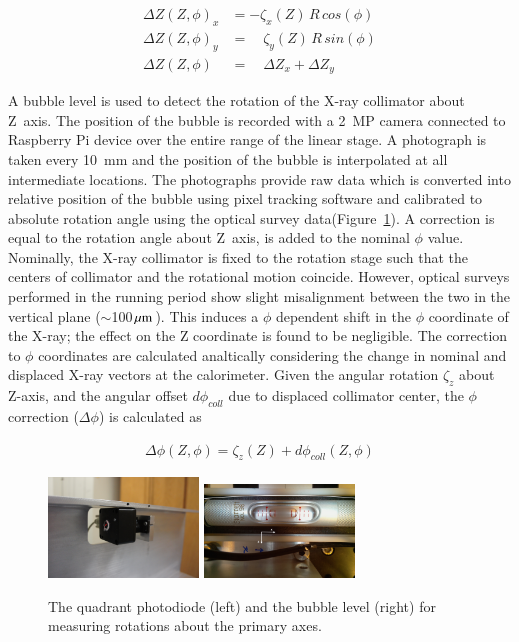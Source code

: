     \begin{align}
      \Delta Z(Z,\phi)_x &= -\zeta_x(Z)\,R\,cos(\phi)     \\
      \Delta Z(Z,\phi)_y &= \quad \zeta_y(Z)\,R\,sin(\phi) \\
      \Delta Z(Z,\phi)\  &= \quad \Delta Z_x + \Delta Z_y
    \end{align}

  A bubble level is used to detect the rotation of the X-ray
  collimator about Z~axis.  The position of the bubble is recorded
  with a 2~MP camera connected to Raspberry Pi device over the entire
  range of the linear stage.  A photograph is taken every 10~mm and
  the position of the bubble is interpolated at all intermediate
  locations. The photographs provide raw data which is converted into
  relative position of the bubble using pixel tracking
  software\cite{imagej} and calibrated to absolute rotation angle
  using the optical survey data(Figure~\ref{fig:bubblelevel}).  A
  correction is equal to the rotation angle about Z~axis, is added to
  the nominal $\phi$ value. Nominally, the X-ray collimator is fixed
  to the rotation stage    such that the centers of collimator and the
  rotational motion     coincide. However, optical surveys performed
  in the running period     show slight misalignment between the two
  in the vertical plane     ($\sim$100$\mathrm{\hspace{0.3 mm}\mu m\hspace{0.5 mm}}$).  This induces a
  $\phi$ dependent shift in the     $\phi$ coordinate of the X-ray;
  the effect on the Z coordinate is     found to be negligible. The
  correction to $\phi$ coordinates are calculated analtically
  considering the change in nominal and     displaced X-ray vectors at
  the calorimeter. Given the angular     rotation $\zeta_z$ about
  Z-axis, and the angular offset $d\phi_{coll}$     due to displaced
  collimator center, the $\phi$ correction      ($\Delta\phi$) is
  calculated as 

  \begin{align} 
  \Delta \phi (Z,\phi) = \zeta_z(Z)+d\phi_{coll}(Z,\phi) 
  \end{align}

    \begin{figure}[]
        \includegraphics[width=4cm]{plots/qpd.jpg}
        \includegraphics[width=4cm]{plots/whitetray.jpg}
      \caption{The quadrant photodiode (left) and the bubble level
                (right) for measuring rotations about the primary
                axes.}
      \label{fig:bubblelevel}
    \end{figure}  


